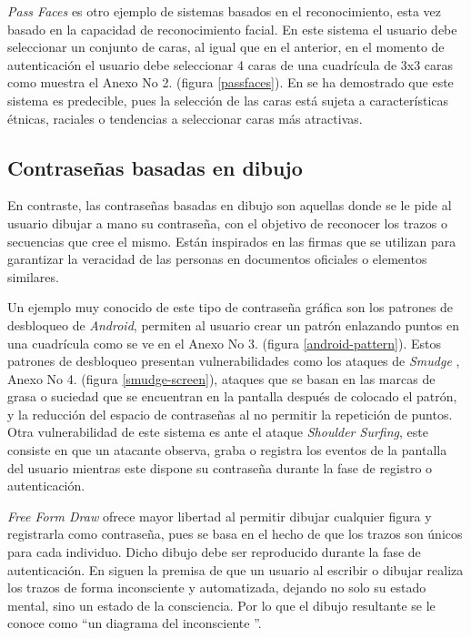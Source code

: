 \textit{Pass Faces} \cite{Tuscano2015GraphicalPA,inproceedings} es otro ejemplo de sistemas basados en el reconocimiento, esta vez basado en la capacidad de reconocimiento facial. En este sistema el usuario debe seleccionar un conjunto de caras, al igual que en el anterior, en el momento de autenticación el usuario debe seleccionar 4 caras de una cuadrícula de 3x3 caras como muestra el Anexo No 2. (figura \ref{passfaces}). En \cite{Tuscano2015GraphicalPA} se ha demostrado que este sistema es predecible, pues la selección de las caras está sujeta a características étnicas, raciales o tendencias a seleccionar caras más atractivas.





\subsection{Contraseñas basadas en dibujo}
En contraste, las contraseñas basadas en dibujo son aquellas donde se le pide al usuario dibujar a mano su contraseña, con el objetivo de reconocer los trazos o secuencias que cree el mismo. Están inspirados en las firmas que se utilizan para garantizar la veracidad de las personas en documentos oficiales o elementos similares. 

Un ejemplo muy conocido de este tipo de contraseña gráfica son los patrones de desbloqueo de \textit{Android}, permiten al usuario crear un patrón enlazando puntos en una cuadrícula como se ve en el Anexo No 3. (figura \ref{android-pattern}). Estos patrones de desbloqueo presentan vulnerabilidades como los ataques de \emph{Smudge} \cite{aviv2010smudge}, Anexo No 4. (figura \ref{smudge-screen}), ataques que se basan en las marcas de grasa o suciedad que se encuentran en la pantalla despu\'es de colocado el patr\'on, y la reducción del espacio de contraseñas al no permitir la repetición de puntos. Otra vulnerabilidad de este sistema  es ante el ataque \emph{Shoulder Surfing}, este consiste en que un atacante observa, graba o registra los eventos de la pantalla del usuario mientras este dispone su contraseña durante la fase de registro o autenticación.






\textit{Free Form Draw} \cite{lin2009free} ofrece mayor libertad al permitir dibujar cualquier figura y registrarla como contraseña, pues se basa en el hecho de que los trazos son únicos para cada individuo. Dicho dibujo debe ser reproducido durante la fase de autenticación. En \cite{lin2009free} siguen la premisa de que un usuario al escribir o dibujar realiza los trazos de forma inconsciente y automatizada, dejando no solo su estado mental, sino un estado de la consciencia. Por lo que el dibujo resultante se le conoce como ``un diagrama del inconsciente ''.

